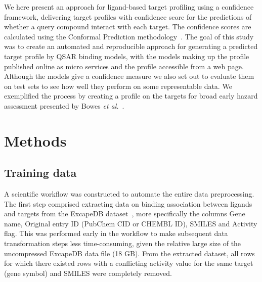\documentclass[10pt,article]{memoir}
\begin{document}
We here present an approach for ligand-based target profiling using a
confidence framework, delivering target profiles with confidence score for the
predictions of whether a query compound interact with each target. The
confidence scores are calculated using the Conformal Prediction
methodology~\cite{Vovk2005}.
%
The goal of this study was to create an automated and reproducible approach for
generating a predicted target profile by QSAR binding models, with the models
making up the profile published online as micro services and the profile
accessible from a web page. Although the models give a confidence measure we
also set out to evaluate them on test sets to see how well they perform on some
representable data. We exemplified the process by creating a profile on the
targets for broad early hazard assessment presented by Bowes \textit{et
al.}~\cite{Bowes2012}.

\section*{Methods}

\subsection{Training data}

A scientific workflow was constructed to automate the entire data
preprocessing.  The first step comprised extracting data on binding association
between ligands and targets from the ExcapeDB dataset~\cite{Sun2017}, more
specifically the columns Gene name, Original entry ID (PubChem CID or CHEMBL
ID), SMILES and Activity flag. This was performed early in the workflow to make
subsequent data transformation steps less time-consuming, given the relative large
size of the uncompressed ExcapeDB data file (18 GB).
%
From the extracted dataset, all rows for which there existed rows with a conflicting
activity value for the same target (gene symbol) and SMILES were completely removed.
\end{document}
